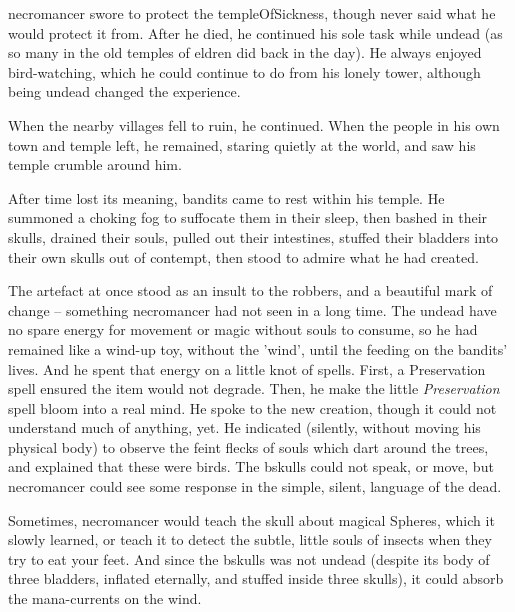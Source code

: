 
\label{necroStory}
\begin{exampletext}
  \noindent
  \Gls{necromancer} swore to protect the \gls{templeOfSickness}, though never said what he would protect it from.
  After he died, he continued his sole task while undead (as so many in the old temples of \gls{eldren} did back in the day).
  He always enjoyed bird-watching, which he could continue to do from his lonely tower, although being undead changed the experience.

  When the nearby \glspl{village} fell to ruin, he continued.
  When the people in his own town and temple left, he remained, staring quietly at the world, and saw his temple crumble around him.

  After time lost its meaning, bandits came to rest within his temple.
  He summoned a choking fog to suffocate them in their sleep, then bashed in their skulls, drained their souls, pulled out their intestines, stuffed their bladders into their own skulls out of contempt, then stood to admire what he had created.

  The \gls{artefact} at once stood as an insult to the robbers, and a beautiful mark of change -- something \gls{necromancer} had not seen in a long time.
  The undead have no spare energy for movement or magic without souls to consume, so he had remained like a wind-up toy, without the 'wind', until the feeding on the bandits' lives.
  And he spent that energy on a little knot of spells.
  First, a Preservation spell ensured the item would not degrade.
  Then, he make the little \textit{Preservation} spell bloom into a real mind.
  He spoke to the new creation, though it could not understand much of anything, yet.
  He indicated (silently, without moving his physical body) to observe the feint flecks of souls which dart around the trees, and explained that these were birds.
  The \gls{bskulls} could not speak, or move, but \gls{necromancer} could see some response in the simple, silent, language of the dead.

  Sometimes, \gls{necromancer} would teach the skull about magical Spheres, which it slowly learned, or teach it to detect the subtle, little souls of insects when they try to eat your feet.
  And since the \gls{bskulls} was not undead (despite its body of three bladders, inflated eternally, and stuffed inside three skulls), it could absorb the mana-currents on the wind.


\end{exampletext}
